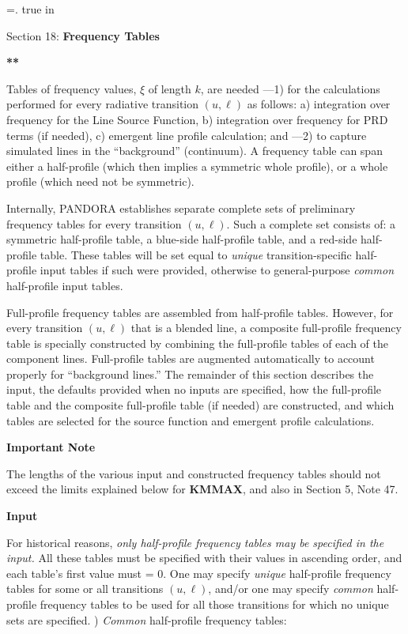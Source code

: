 %
\newtoks\footline \footline={\hss{}.\folio\hss}
%
%
\top
{} true in
\centerline{Section 18: {\bf Frequency Tables}}
\blankline
\blankline
\centerline{\bf ***}
\blankline
\blankline
Tables of frequency values, $\xi$ of length $k$,
are needed ---1) for the calculations performed for
every radiative transition $(u,\ell)$ as follows:
a) integration over frequency for the Line Source Function,
b) integration over frequency for PRD terms (if needed),
c) emergent line profile calculation;
and ---2) to capture simulated lines in the ``background''
(continuum). A frequency table can span either a 
half-profile (which then implies a symmetric whole profile), or a
whole profile (which need not be symmetric).

Internally, PANDORA establishes separate complete sets of preliminary frequency tables
for every transition $(u,\ell)$. Such a complete set consists of:
a symmetric half-profile table, a blue-side half-profile table,
and a red-side half-profile table. These tables will be set equal
to {\it unique} transition-specific half-profile input tables if
such were provided, otherwise to general-purpose {\it common} half-profile input tables.

Full-profile frequency tables are assembled from half-profile tables. However, for every
transition $(u,\ell)$ that is a blended line, a composite full-profile frequency
table is specially constructed by combining the full-profile tables of each
of the component lines. Full-profile tables are augmented automatically
to account properly for ``background lines.''
\blankline
The remainder of this section describes the input, the defaults provided
when no inputs are specified, how the full-profile table and the composite
full-profile table (if needed) are constructed, and which tables are selected
for the source function and emergent profile calculations.
\blankline
\vfill \vfill
\vfill \vfill
\vfill \vfill
\vfill \vfill
\centerline{\bf Important Note}
\blankline
The lengths of the various input and constructed frequency tables should
not exceed the limits explained below for {\bf KMMAX}, and also in
Section 5, Note 47.
\ej
\centerline{\bf Input}
\blankline
For historical reasons, {\it only half-profile frequency tables may be specified in the input.}
All these tables must be specified with their values in ascending order, and each table's
first value must = 0.
\blankline
One may specify {\it unique} half-profile frequency tables for some or all transitions
$(u,\ell)$, and/or one may specify {\it common} half-profile frequency tables to be
used for all those transitions for which no unique sets are specified.
\blankline
{}) {\it Common} half-profile frequency tables:

